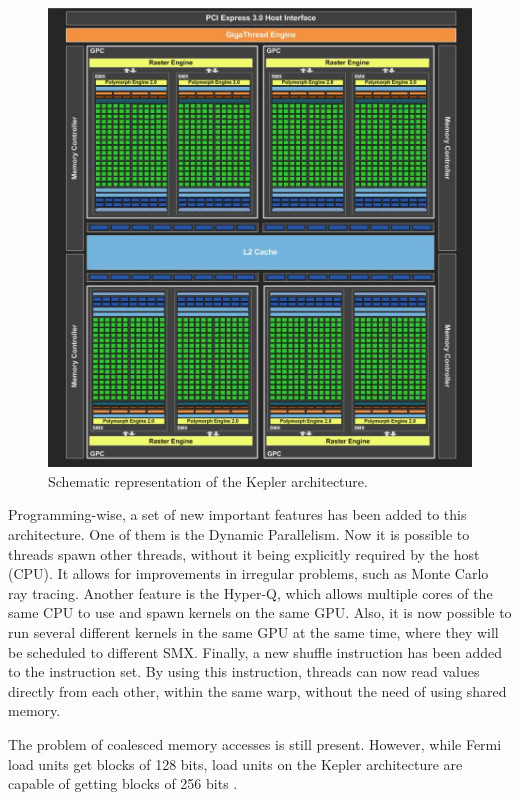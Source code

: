 \begin{figure}[!htp]
	\begin{center}
		\includegraphics[scale=0.4]{../../common/img/kepler_arch.jpg}
		\caption{Schematic representation of the \nvidia Kepler architecture.}
		\label{fig:kepler}
	\end{center}
\end{figure}

Programming-wise, a set of new important features has been added to this architecture. One of them is the Dynamic Parallelism. Now it is possible to \cuda threads spawn other threads, without it being explicitly required by the host (CPU). It allows for improvements in irregular problems, such as Monte Carlo ray tracing. Another feature is the Hyper-Q, which allows multiple cores of the same CPU to use and spawn kernels on the same GPU. Also, it is now possible to run several different kernels in the same GPU at the same time, where they will be scheduled to different SMX. Finally, a new shuffle instruction has been added to the instruction set. By using this instruction, \cuda threads can now read values directly from each other, within the same warp, without the need of using shared memory.

The problem of coalesced memory accesses is still present. However, while Fermi load units get blocks of 128 bits, load units on the Kepler architecture are capable of getting blocks of 256 bits \cite{NVIDIA:Kepler}.

